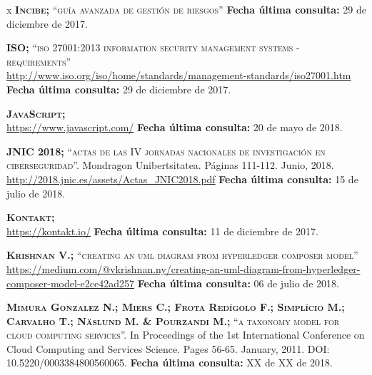 \begin{thebibliography} {x}
	 \textsc{\textbf{Incibe; }}\textsc{“guía avanzada de gestión de riesgos”}
	\newline \textbf{Fecha última consulta:} 29 de diciembre de 2017.
		
	 \textsc{\textbf{ISO; }}\textsc{“iso 27001:2013 information security management systems - requirements”} \\
	\url{http://www.iso.org/iso/home/standards/management-standards/iso27001.htm}
	\newline \textbf{Fecha última consulta:} 29 de diciembre de 2017.
		
	 \textsc{\textbf{JavaScript; }} \\ 
	\url{https://www.javascript.com/}
	\newline \textbf{Fecha última consulta:} 20 de mayo de 2018.
		
	 \textsc{\textbf{JNIC 2018; }}\textsc{“actas de las IV jornadas nacionales de investigación en ciberseguridad”.} Mondragon Unibertsitatea. Páginas 111-112. Junio, 2018. \\
	\url{http://2018.jnic.es/assets/Actas_JNIC2018.pdf}
	\newline \textbf{Fecha última consulta:} 15 de julio de 2018.
	
	 \textsc{\textbf{Kontakt; }} \\
	\url{https://kontakt.io/}
	\newline \textbf{Fecha última consulta:} 11 de diciembre de 2017.
	
	 \textsc{\textbf{Krishnan V.; }}\textsc{“creating an uml diagram from hyperledger composer model”} \\
	\url{https://medium.com/@vkrishnan.ny/creating-an-uml-diagram-from-hyperledger-composer-model-e2ce42ad257}
	\newline \textbf{Fecha última consulta:} 06 de julio de 2018.
		
	 \textsc{\textbf{Mimura Gonzalez N.; Miers C.; Frota Redígolo F.; Simplício M.; Carvalho T.; Näslund M. \& Pourzandi M.; }}\textsc{“a taxonomy model for cloud computing services”.} In Proceedings of the 1st International Conference on Cloud Computing and Services Science. Pages 56-65. January, 2011. DOI: 10.5220/0003384800560065.
	\newline \textbf{Fecha última consulta:} XX de XX de 2018.
		

\end{thebibliography}
